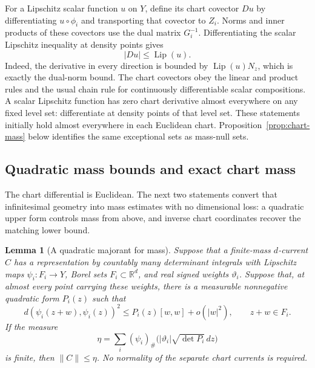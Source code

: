 \documentclass[11pt]{article}
\numberwithin{equation}{section}
\newtheorem{lemma}[theorem]{Lemma}
\theoremstyle{definition}
\theoremstyle{remark}
\newcommand{\R}{\mathbb R}
\newcommand{\dd}{\,d}
\newcommand{\Lip}{\operatorname{Lip}}
\begin{document}
For a Lipschitz scalar function \(u\) on \(Y\), define its chart covector
\(Du\) by differentiating \(u\circ\phi_i\) and transporting that covector
to \(Z_i\). Norms and inner products of these covectors use the dual
matrix \(G_i^{-1}\). Differentiating the scalar Lipschitz inequality at
density points gives
\begin{equation}
\label{eq:gradient-lipschitz}
 |Du|\le\Lip(u).
\end{equation}
Indeed, the derivative in every direction is bounded by
\(\Lip(u)N_z\), which is exactly the dual-norm bound. The chart covectors
obey the linear and product rules and the usual chain rule for continuously
differentiable scalar compositions. A scalar Lipschitz function has zero
chart derivative almost everywhere on any fixed level set: differentiate
at density points of that level set. These statements initially hold
almost everywhere in each Euclidean chart. Proposition~\ref{prop:chart-mass}
below identifies the same exceptional sets as mass-null sets.

\subsection{Quadratic mass bounds and exact chart mass}

The chart differential is Euclidean. The next two statements convert
that infinitesimal geometry into mass estimates with no dimensional
loss: a quadratic upper form controls mass from above, and inverse
chart coordinates recover the matching lower bound.

\begin{lemma}[A quadratic majorant for mass]
\label{lem:quadratic-mass}
Suppose that a finite-mass \(d\)-current \(C\) has a representation by
countably many determinant integrals with Lipschitz maps
\(\psi_i:F_i\to Y\), Borel sets \(F_i\subset\R^d\), and real signed
weights \(\vartheta_i\). Suppose that, at almost every point carrying
these weights, there is a measurable nonnegative quadratic form
\(P_i(z)\) such that
\begin{equation}
\label{eq:quadratic-distance-majorant}
 d(\psi_i(z+w),\psi_i(z))^2
 \le P_i(z)[w,w]+o(|w|^2),\qquad z+w\in F_i.
\end{equation}
If the measure
\begin{equation}
\label{eq:quadratic-mass-majorant}
 \eta=\sum_i(\psi_i)_\#
       \bigl(|\vartheta_i|\sqrt{\det P_i}\dd z\bigr)
\end{equation}
is finite, then \(\|C\|\le\eta\). No normality of the separate chart
currents is required.
\end{lemma}
\end{document}
